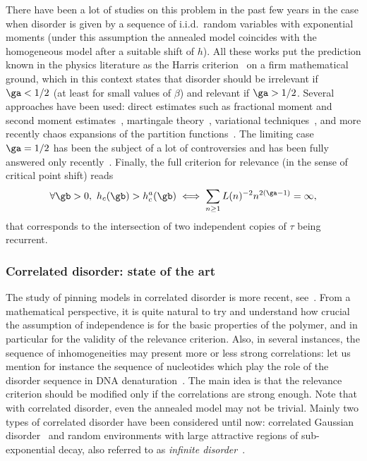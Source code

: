 There have been a lot of studies on this problem in the past few years in the case when disorder is given by a sequence of i.i.d.~random variables with exponential moments (under this assumption the annealed model coincides with the homogeneous model after a suitable shift of $h$). All these works put the prediction known in the physics literature as the Harris criterion~\cite{H74} on a firm mathematical ground, which in this context states that disorder should be irrelevant if $\ga < 1/2$ (at least for small values of $\beta$) and relevant if $\ga > 1/2$. Several approaches have been used: direct estimates such as fractional moment and second moment estimates~\cite{AS06, AZ09, BL15, BCPSZ14, CadH13, DGLT09, GiT2006, GTL09}, martingale theory~\cite{L10}, variational techniques~\cite{CdH13}, and more recently chaos expansions of the partition functions~\cite{CSZ16+,CSZ16,CTT16+}. The limiting case $\ga = 1/2$ has been the subject of a lot of controversies and has been fully answered only recently~\cite{BL15}. Finally, the full criterion for relevance (in the sense of critical point shift) reads
\begin{equation}
\forall \gb > 0,\ h_c(\gb) > h_c^a(\gb) \iff \sum_{n \geq 1} L(n)^{- 2} n^{2 (\ga - 1)} = \infty,
\end{equation}
that corresponds to the intersection of two independent copies of $\tau$ being recurrent.

\subsubsection{Correlated disorder: state of the art}

The study of pinning models in correlated disorder is more recent, see~\cite{B13, B14, BL12, BP15, P13}. From a mathematical perspective, it is quite natural to try and understand how crucial the assumption of independence is for the basic properties of the polymer, and in particular for the validity of the relevance criterion. Also, in several instances, the sequence of inhomogeneities may present more or less strong correlations: let us mention for instance the sequence of nucleotides which play the role of the disorder sequence in DNA denaturation~\cite{JPS06}. The main idea is that the relevance criterion should be modified only if the correlations are strong enough. Note that with correlated disorder, even the annealed model may not be trivial. Mainly two types of correlated disorder have been considered until now: correlated Gaussian disorder~\cite{B13, BP15, P13} and random environments with large attractive regions of sub-exponential decay, also referred to as \emph{infinite disorder}~\cite{B14, BL12}.

